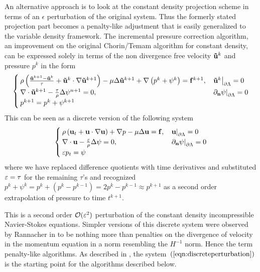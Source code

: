 \documentclass[letterpaper]{erdc}
\begin{document}
An alternative approach is to look at the constant density projection scheme in terms of an $\epsilon$ perturbation of the original system. Thus the formerly stated projection part becomes a penalty-like adjustment that is easily generalized to the variable density framework.  The incremental pressure correction algorithm, an improvement on the original Chorin/Temam algorithm for constant density, can be expressed solely in terms of the non divergence free velocity $\mathbf{\tilde{u}}^{k}$ and pressure $p^{k}$ in the form
\begin{equation}
  \begin{cases}
    \rho\left(\frac{\mathbf{\tilde{u}}^{k+1} - \mathbf{\tilde{u}}^{k}}{\tau} + \mathbf{\tilde{u}}^{k}\cdot\nabla\mathbf{\tilde{u}}^{k+1} \right) - \mu\Delta\mathbf{\tilde{u}}^{k+1} + \nabla\left(p^{k} + \psi^{k}  \right) = \mathbf{f}^{k+1}, & \left.\mathbf{\tilde{u}}^{k}\right|_{\partial\Lambda} = 0\\
    \nabla\cdot\mathbf{\tilde{u}}^{k+1} - \frac{\tau}{\rho}\Delta\psi^{n+1}=0, &\left.\partial_{\textbf{n}} \psi\right|_{\partial\Lambda} = 0\\
    p^{k+1} = p^{k} + \psi^{k+1}
  \end{cases}
\end{equation}
This can be seen as a discrete version of the following system   
\begin{equation}\label{eqn:discreteperturbation}
  \begin{cases}
    \rho\left(\textbf{u}_t + \textbf{u}\cdot\nabla\textbf{u}  \right) + \nabla p -\mu\Delta\textbf{u} = \mathbf{f}, & \left.\textbf{u}\right|_{\partial\Lambda} = 0\\
    \nabla\cdot\textbf{u} - \frac{\varepsilon}{\rho}\Delta \psi = 0,& \left.\partial_{\textbf{n}} \psi\right|_{\partial\Lambda} = 0\\
    \varepsilon p_t = \psi
  \end{cases}
\end{equation}
where we have replaced difference quotients with time derivatives and substituted $\varepsilon = \tau$ for the remaining $\tau$'s and recognized $p^{k} + \psi^{k} = p^{k} + \left( p^{k} - p^{k-1} \right) = 2p^{k} - p^{k-1} \approx p^{k+1}$ as a second order extrapolation of pressure to time $t^{k+1}$.

This is a second order $\mathcal{O}(\varepsilon^2)$ perturbation of the constant density incompressible Navier-Stokes equations.  Simpler versions of this discrete system were observed by Rannacher in \cite{rannacher1992chorin} to be nothing more than penalties on the divergence of velocity in the momentum equation in a norm resembling the $H^{-1}$ norm.  Hence the term penalty-like algorithms.  As described in \cite{guermond2009splitting}, the system~$\left(\ref{eqn:discreteperturbation}\right)$ is the starting point for the algorithms described below.
\end{document}
